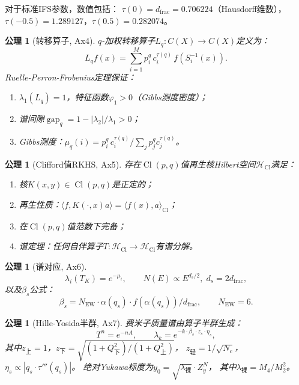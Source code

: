 \documentclass[12pt,a4paper]{ctexart}
\newtheorem{axiom}[theorem]{公理}
\newcommand{\Cl}{\operatorname{Cl}}
\newcommand{\HH}{\mathcal{H}}
\newcommand{\gap}{\operatorname{gap}}
\begin{document}
对于标准IFS参数，数值包括：
$\tau(0) = d_{\text{frac}} = 0.706224$（Hausdorff维数），
$\tau(-0.5) = 1.289127$，$\tau(0.5) = 0.282074$。

\begin{axiom}[转移算子, Ax4]
$q$-加权转移算子$L_q: C(X) \to C(X)$定义为：
\begin{equation}
L_q f(x) = \sum_{i=1}^M p_i^q \, c_i^{\tau(q)} \, f(S_i^{-1}(x)).
\label{eq:transfer}
\end{equation}
Ruelle-Perron-Frobenius定理保证：
\begin{enumerate}
  \item $\lambda_1(L_q) = 1$，特征函数$\varphi_1 > 0$（Gibbs测度密度）；
  \item 谱间隙$\gap_q = 1 - |\lambda_2|/\lambda_1 > 0$；
  \item Gibbs测度：$\mu_q(i) = p_i^q \, c_i^{\tau(q)} / \sum_j p_j^q c_j^{\tau(q)}$。
\end{enumerate}
\end{axiom}

\begin{axiom}[Clifford值RKHS, Ax5]
存在$\Cl(p,q)$值再生核Hilbert空间$\HH_{\Cl}$满足：
\begin{enumerate}
  \item 核$K(x,y) \in \Cl(p,q)$是正定的；
  \item 再生性质：$\langle f, K(\cdot, x)a \rangle = \langle f(x), a \rangle_{\Cl}$；
  \item 在$\Cl(p,q)$值范数下完备；
  \item 谱定理：任何自伴算子$T: \HH_{\Cl} \to \HH_{\Cl}$有谱分解。
\end{enumerate}
\end{axiom}

\begin{axiom}[谱对应, Ax6]
\begin{equation}
\lambda_i(T_K) = e^{-\mu_i}, \qquad N(E) \propto E^{d_s/2},\; d_s = 2 d_{\text{frac}},
\end{equation}
以及$\beta_s$公式：
\begin{equation}
\beta_s = N_{\text{EW}} \cdot \alpha(q_s) \cdot f(\alpha(q_s)) / d_{\text{frac}}, 
\qquad N_{\text{EW}} = 6.
\label{eq:beta}
\end{equation}
\end{axiom}

\begin{axiom}[Hille-Yosida半群, Ax7]
费米子质量谱由算子半群生成：
\begin{equation}
T^n = e^{-nA}, \qquad \lambda_k = e^{-k \cdot \beta_s \cdot z_s \cdot \eta_s},
\label{eq:semigroup}
\end{equation}
其中$z_{\text{上}} = 1$，$z_{\text{下}} = \sqrt{(1+Q_{\text{下}}^2)/(1+Q_{\text{上}}^2)}$，
$z_{\text{轻}} = 1/\sqrt{N_c}$，$\eta_s \propto |q_s \cdot \tau'''(q_s)|$。
绝对Yukawa标度为$y_0 = \sqrt{\lambda_{\text{裸}}} \cdot Z_y^N$，
其中$\lambda_{\text{裸}} = M_4/M_2^2$。
\end{axiom}
\end{document}
